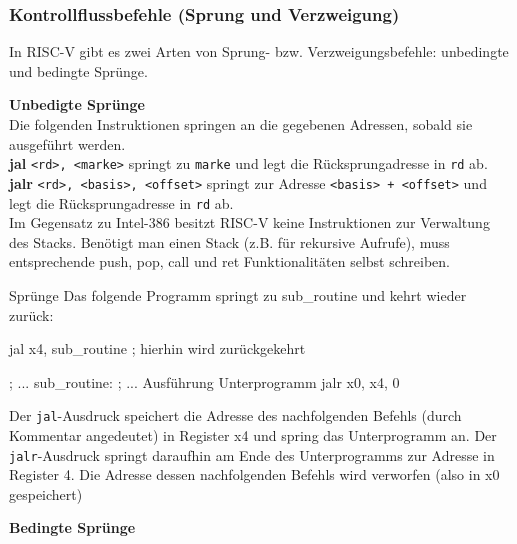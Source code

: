 \subsubsection{Kontrollflussbefehle (Sprung und Verzweigung)}
\label{manual-riscv-jump-instructions}
In RISC-V gibt es zwei Arten von Sprung- bzw. Verzweigungsbefehle: unbedingte und bedingte Sprünge.

\textbf{Unbedigte Sprünge}\\

Die folgenden Instruktionen springen an die gegebenen Adressen, sobald sie ausgeführt werden.\\
\textbf{jal} \texttt{<rd>, <marke>} springt zu \texttt{marke} und legt die Rücksprungadresse in \texttt{rd} ab.\\
\textbf{jalr} \texttt{<rd>, <basis>, <offset>} springt zur Adresse \texttt{<basis> + <offset>} und legt die Rücksprungadresse in \texttt{rd} ab.\\

Im Gegensatz zu Intel-386 besitzt RISC-V keine Instruktionen zur Verwaltung des Stacks. Benötigt man einen Stack (z.B. für rekursive Aufrufe), muss entsprechende push, pop, call und ret Funktionalitäten selbst schreiben.

\begin{exampleblock}{Sprünge}
Das folgende Programm springt zu sub\_routine und kehrt wieder zurück:
\begin{riscv}
  jal x4, sub_routine
  ; hierhin wird zurückgekehrt

  ; ...
sub_routine:
  ; ... Ausführung Unterprogramm
  jalr x0, x4, 0
\end{riscv}
Der \texttt{jal}-Ausdruck speichert die Adresse des nachfolgenden Befehls (durch Kommentar angedeutet) in Register x4 und spring das Unterprogramm an. Der \texttt{jalr}-Ausdruck springt daraufhin am Ende des Unterprogramms zur Adresse in Register 4. Die Adresse dessen nachfolgenden Befehls wird verworfen (also in x0 gespeichert)
\end{exampleblock}

\textbf{Bedingte Sprünge}\\

